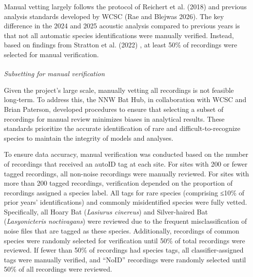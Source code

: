 \documentclass[
  letterpaper,
  DIV=11,
  numbers=noendperiod]{scrartcl}
\makeatletter
\let\oldparagraph\paragraph
\renewcommand{\paragraph}{
    \@ifstar
      \xxxParagraphStar
      \xxxParagraphNoStar
  }
\newcommand{\xxxParagraphStar}[1]{\oldparagraph*{#1}\mbox{}}
\newcommand{\xxxParagraphNoStar}[1]{\oldparagraph{#1}\mbox{}}
\makeatother
\begin{document}
Manual vetting largely follows the protocol of Reichert et al. (2018)
and previous analysis standards developed by WCSC (Rae and Blejwas
2026). The key difference in the 2024 and 2025 acoustic analysis
compared to previous years is that not all automatic species
identifications were manually verified. Instead, based on findings from
Stratton et al. (2022) , at least 50\% of recordings were selected for
manual verification.

\paragraph{\texorpdfstring{\emph{Subsetting for manual
verification}}{Subsetting for manual verification}}\label{subsetting-for-manual-verification}

Given the project's large scale, manually vetting all recordings is not
feasible long-term. To address this, the NNW Bat Hub, in collaboration
with WCSC and Brian Paterson, developed procedures to ensure that
selecting a subset of recordings for manual review minimizes biases in
analytical results. These standards prioritize the accurate
identification of rare and difficult-to-recognize species to maintain
the integrity of models and analyses.

To ensure data accuracy, manual verification was conducted based on the
number of recordings that received an autoID tag at each site. For sites
with 200 or fewer tagged recordings, all non-noise recordings were
manually reviewed. For sites with more than 200 tagged recordings,
verification depended on the proportion of recordings assigned a species
label. All tags for rare species (comprising ≤10\% of prior years'
identifications) and commonly misidentified species were fully vetted.
Specifically, all Hoary Bat (\emph{Lasiurus cinereus}) and Silver-haired
Bat (\emph{Lasyonicteris noctivagans}) were reviewed due to the frequent
misclassification of noise files that are tagged as these species.
Additionally, recordings of common species were randomly selected for
verification until 50\% of total recordings were reviewed. If fewer than
50\% of recordings had species tags, all classifier-assigned tags were
manually verified, and ``NoID'' recordings were randomly selected until
50\% of all recordings were reviewed.
\end{document}
